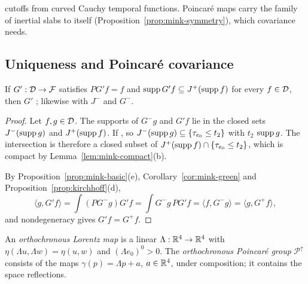 \begin{remark}
\begin{itemize}[leftmargin=2em]
\end{itemize}
 cutoffs from curved Cauchy temporal functions. Poincar\'e maps carry the family of inertial slabs
to itself (Proposition~\ref{prop:mink-symmetry}), which covariance needs.
\end{remark}

\subsection{Uniqueness and Poincar\'e covariance}

\begin{theorem}\label{thm:mink-unique}
If  $G':\mathcal D\to\mathcal F$ satisfies $PG'f=f$ and $\operatorname{supp} G'f\subseteq J^+(\operatorname{supp} f)$ for every
$f\in\mathcal D$, then $G'$ ; likewise with
$J^-$ and $G^-$.
\end{theorem}
\begin{proof}
 Let $f,g\in\mathcal D$. The supports of $G^-g$ and $G'f$ lie in the closed sets $J^-(\operatorname{supp} g)$ and
$J^+(\operatorname{supp} f)$. If , so $J^-(\operatorname{supp} g)\subseteq\{\tau_{e_0}\leq t_2\}$ with $t_2$
 $\operatorname{supp} g$. The intersection is therefore a closed subset of
$J^+(\operatorname{supp} f)\cap\{\tau_{e_0}\leq t_2\}$, which is compact by Lemma~\ref{lem:mink-compact}(b).

 By Proposition~\ref{prop:mink-basic}(e), Corollary~\ref{cor:mink-green} and
Proposition~\ref{prop:kirchhoff}(d),
\[
\langle g,G'f\rangle=\int(PG^-g)G'f=\int G^-g\,PG'f=\langle f,G^-g\rangle=\langle g,G^+f\rangle,
\]
and nondegeneracy gives $G'f=G^+f$.
\end{proof}

\begin{definition}\label{def:mink-poincare}
An \emph{orthochronous Lorentz map} is a linear $\Lambda:\mathbb R^4\to\mathbb R^4$ with
$\eta(\Lambda u,\Lambda w)=\eta(u,w)$ and $(\Lambda e_0)^0>0$. The \emph{orthochronous Poincar\'e
group} $\mathcal P^\uparrow$ consists of the maps $\gamma(p)=\Lambda p+a$, $a\in\mathbb R^4$, under composition;
it contains the space reflections.
\end{definition}

